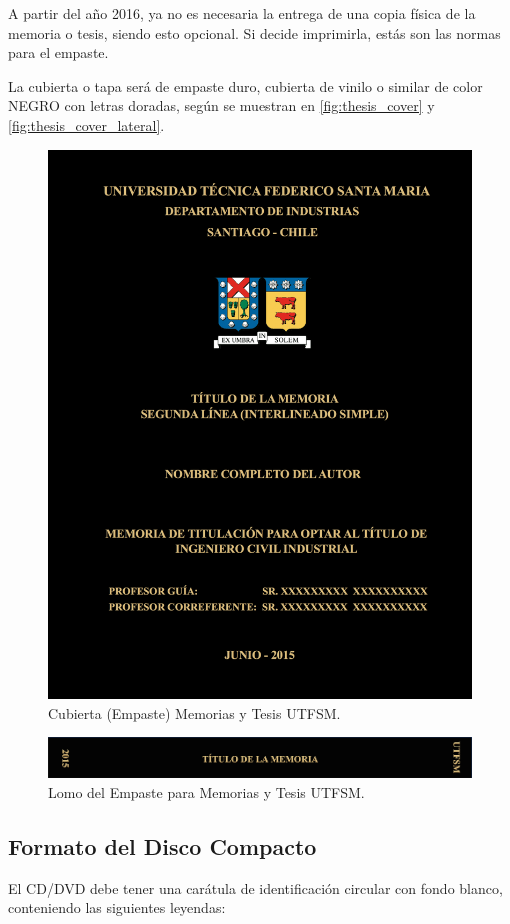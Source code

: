 A partir del año 2016, ya no es necesaria la entrega de una copia física de la memoria o tesis, siendo esto opcional. Si decide imprimirla, estás son las normas para el empaste.

La cubierta o tapa será de empaste duro, cubierta de vinilo o similar de color NEGRO con letras doradas, según se muestran en \autoref{fig:thesis_cover} y \autoref{fig:thesis_cover_lateral}.

\begin{figure}[ht!]
\centering
\includegraphics[width=.7\textwidth]{figures/thesis_cover.png}
\caption{Cubierta (Empaste) Memorias y Tesis UTFSM.}
\label{fig:thesis_cover}
\end{figure}

\begin{figure}[ht!]
\centering
\includegraphics[width=.7\textwidth]{figures/thesis_cover_lateral.png}
\caption{Lomo del Empaste para Memorias y Tesis UTFSM.}
\label{fig:thesis_cover_lateral}
\end{figure}

\subsection{Formato del Disco Compacto}

El CD/DVD debe tener una carátula de identificación circular con fondo blanco, conteniendo las siguientes leyendas:


